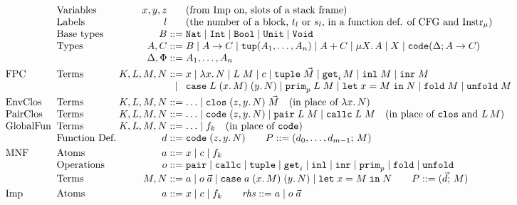 \begin{figure}[t]
\footnotesize
\[
\begin{array}{@{}l@{\;\;}l@{\;}r@{\;}c@{\;}l@{}}
 & \text{Variables} & x, y, z & & \text{(from Imp on, slots of a stack frame)}\\
 & \text{Labels} & l & & \text{(the number of a block, $t_l$ or $s_l$, in a function def. of CFG and \instr{})}\\
 & \text{Base types} & B & ::= & \kw{Nat} \mid \kw{Int} \mid \kw{Bool} \mid \kw{Unit} \mid \kw{Void}\\
 & \text{Types} & A, C & ::= & B \mid A \rightarrow C \mid \kw{tup}(A_1, \ldots, A_n)
  \mid A + C \mid \mu X.\, A \mid X \mid \kw{code}(\Delta; A \rightarrow C)\\
 & & \Delta, \Phi & ::= & A_1, \ldots, A_n\\[3pt]
\fpc & \text{Terms} & K, L, M, N & ::= & x \mid \lambda x.\, N \mid L\;M \mid c
  \mid \kw{tuple}\;\vec{M} \mid \kw{get}_i\,M \mid \kw{inl}\;M \mid \kw{inr}\;M\\
 & & & \mid & \kw{case}\;L\;(x.\,M)\;(y.\,N) \mid \kw{prim}_p\;L\;M \mid \kw{let}\;x = M\;\kw{in}\;N
  \mid \kw{fold}\;M \mid \kw{unfold}\;M\\[3pt]
\text{EnvClos} & \text{Terms} & K, L, M, N & ::= & \ldots \mid \kw{clos}\;(z, y.\,N)\;\vec{M}
  \quad (\text{in place of } \lambda x.\, N)\\
\text{PairClos} & \text{Terms} & K, L, M, N & ::= & \ldots \mid \kw{code}\;(z, y.\,N) \mid \kw{pair}\;L\;M \mid \kw{callc}\;L\;M
  \quad (\text{in place of } \kw{clos} \text{ and } L\,M)\\
\text{GlobalFun} & \text{Terms} & K, L, M, N & ::= & \ldots \mid f_k
  \quad (\text{in place of } \kw{code})\\
 & \text{Function Def.} & d & ::= & \kw{code}\;(z, y.\,N) \qquad P ::= (d_0, \ldots, d_{m-1};\, M)\\[3pt]
\text{MNF} & \text{Atoms} & a & ::= & x \mid c \mid f_k\\
 & \text{Operations} & o & ::= & \kw{pair} \mid \kw{callc} \mid \kw{tuple} \mid \kw{get}_i \mid \kw{inl}
  \mid \kw{inr} \mid \kw{prim}_p \mid \kw{fold} \mid \kw{unfold}\\
 & \text{Terms} & M, N & ::= & a \mid o\;\vec{a} \mid \kw{case}\;a\;(x.\,M)\;(y.\,N)
  \mid \kw{let}\;x = M\;\kw{in}\;N
  \qquad P ::= (\vec{d};\, M)\\[3pt]
\text{Imp} & \text{Atoms} & a & ::= & x \mid c \mid f_k
  \qquad \rhs ::= a \mid o\;\vec{a}\\

\end{array}\]
\end{figure}
